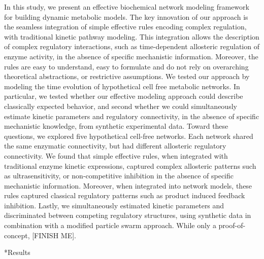 \documentclass[12pt]{article}
\makeatletter
\renewcommand\section{\@startsection
	{subsection}{2}{0mm}
	{-0.2in}
	{0.05\baselineskip}
	{\normalfont\large\bfseries}}
\makeatother
\begin{document}
In this study, we present an effective biochemical network modeling framework for building dynamic metabolic models.
The key innovation of our approach is the seamless integration of simple effective rules encoding complex regulation, with traditional kinetic pathway modeling.
This integration allows the description of complex regulatory interactions, such as time-dependent allosteric regulation of enzyme activity, in the absence of specific mechanistic information.
Moreover, the rules are easy to understand, easy to formulate 
and do not rely on overarching theoretical abstractions, or restrictive assumptions.
We tested our approach by modeling the time evolution of hypothetical cell free metabolic networks. 
In particular, we tested whether our effective modeling approach could describe classically expected behavior, 
and second whether we could simultaneously estimate kinetic parameters and regulatory connectivity, in the absence of specific mechanistic knowledge, 
from synthetic experimental data. Toward these questions, we explored five hypothetical cell-free networks. 
Each network shared the same enzymatic connectivity, but had different allosteric regulatory connectivity. 
We found that simple effective rules, when integrated with traditional enzyme kinetic expressions,
captured complex allosteric patterns such as ultrasensitivity, or non-competitive inhibition in the absence of specific mechanistic information. 
Moreover, when integrated into network models, these rules captured classical regulatory patterns such as product induced feedback inhibition. 
Lastly, we simultaneously estimated kinetic parameters and discriminated between competing regulatory structures, using synthetic data in combination with a
modified particle swarm approach. While only a proof-of-concept, [FINISH ME].

\clearpage

\section*{Results}
\end{document}

